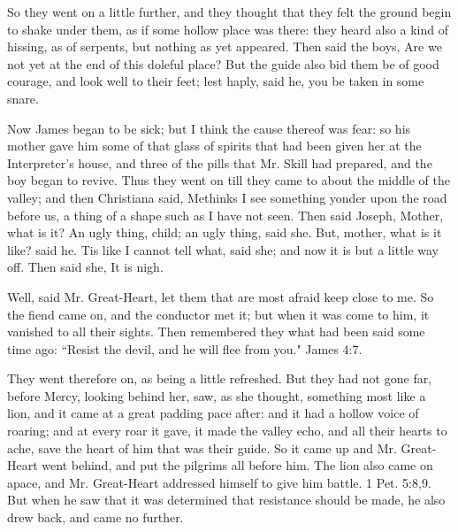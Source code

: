 So they went on a little further, and they thought that they felt the ground begin to shake under them, as if some hollow place was there: they heard also a kind of hissing, as of serpents, but nothing as yet appeared. Then said the boys, Are we not yet at the end of this doleful place? But the guide also bid them be of good courage, and look well to their feet; lest haply, said he, you be taken in some snare.

Now James began to be sick; but I think the cause thereof was fear: so his mother gave him some of that glass of spirits that had been given her at the Interpreter's house, and three of the pills that Mr. Skill had prepared, and the boy began to revive. Thus they went on till they came to about the middle of the valley; and then Christiana said, Methinks I see something yonder upon the road before us, a thing of a shape such as I have not seen. Then said Joseph, Mother, what is it? An ugly thing, child; an ugly thing, said she. But, mother, what is it like? said he. Tis like I cannot tell what, said she; and now it is but a little way off. Then said she, It is nigh.

Well, said Mr. Great-Heart, let them that are most afraid keep close to me. So the fiend came on, and the conductor met it; but when it was come to him, it vanished to all their sights. Then remembered they what had been said some time ago: ``Resist the devil, and he will flee from you." James 4:7.

They went therefore on, as being a little refreshed. But they had not gone far, before Mercy, looking behind her, saw, as she thought, something most like a lion, and it came at a great padding pace after: and it had a hollow voice of roaring; and at every roar it gave, it made the valley echo, and all their hearts to ache, save the heart of him that was their guide. So it came up and Mr. Great-Heart went behind, and put the pilgrims all before him. The lion also came on apace, and Mr. Great-Heart addressed himself to give him battle. 1 Pet. 5:8,9. But when he saw that it was determined that resistance should be made, he also drew back, and came no further.


